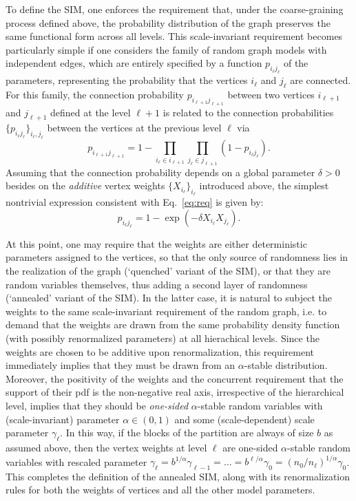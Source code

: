\documentclass[11pt, reqno]{amsart}
\numberwithin{equation}{section}
\theoremstyle{plain} %
\theoremstyle{definition} %
\newcommand{\revise}[1]{{\color{black}#1}}
\begin{document}
To define the SIM, one enforces the requirement that, under the coarse-graining process defined above, the probability distribution of the graph preserves the same functional form across all levels. This scale-invariant requirement  becomes particularly simple if one considers the family of random graph models with independent edges, which are entirely specified by a function $p_{i_\ell j_\ell}$ of the parameters, representing the probability that the vertices $i_\ell$ and $j_\ell$ are connected.
For this family, the connection probability $p_{i_{\ell+1} j_{\ell+1}}$ between two vertices $i_{\ell+1}$ and $j_{\ell+1}$ defined at the level $\ell+1$ is related to the connection probabilities $\{p_{i_\ell j_\ell}\}_{i_\ell,j_\ell}$ between the vertices at the previous level $\ell$ via
\begin{equation}
p_{i_{\ell+1} j_{\ell+1}}=1-\prod_{i_\ell\in i_{\ell+1}}\prod_{j_\ell\in j_{\ell+1}}(1-p_{i_\ell j_\ell}).\label{eq:req}
\end{equation}
Assuming that the connection probability depends on \revise{a global parameter $\delta>0$} besides on the  \emph{additive} vertex weights $\{X_{i_\ell}\}_{i_\ell}$ introduced above, the simplest nontrivial expression consistent with Eq.~\eqref{eq:req} is given by:
\begin{equation} \label{eq:p_ij SIM}
    p_{i_\ell j_\ell} = 1 - \exp\left({-\delta X_{i_\ell} X_{j_\ell}}\right).
\end{equation}

At this point, one may require that the weights are either deterministic parameters assigned to the vertices, so that the only source of randomness lies in the realization of the graph (`quenched' variant of the SIM), or that they are random variables themselves, thus adding a second layer of randomness (`annealed' variant of the SIM). 
In the latter case, it is natural to subject the weights to the same scale-invariant requirement of the random graph, i.e. to demand that the weights are drawn from the same probability density function (with possibly renormalized parameters) at all hierachical levels. 
Since the weights are chosen to be additive upon renormalization, this requirement immediately implies that they must be drawn from an $\alpha$-stable distribution.
Moreover, the positivity of the weights and the concurrent requirement that the support of their pdf is the non-negative real axis, irrespective of the hierarchical level, implies that they should be \emph{one-sided} $\alpha$-stable random variables with (scale-invariant) parameter $\alpha\in(0,1)$ and some (scale-dependent) scale parameter $\gamma_\ell$.
In this way, if the blocks of the partition are always of size $b$ as assumed above, then the vertex weights at level $\ell$ are one-sided $\alpha$-stable random variables with rescaled parameter $\gamma_{\ell} = b^{1/\alpha} \gamma_{\ell-1}=\dots=b^{\ell/\alpha} \gamma_{0}=(n_0/n_\ell)^{1/\alpha}\gamma_0$.
This completes the definition of the annealed SIM, along with its renormalization rules for both the weights of vertices and all the other model parameters.
\end{document}
